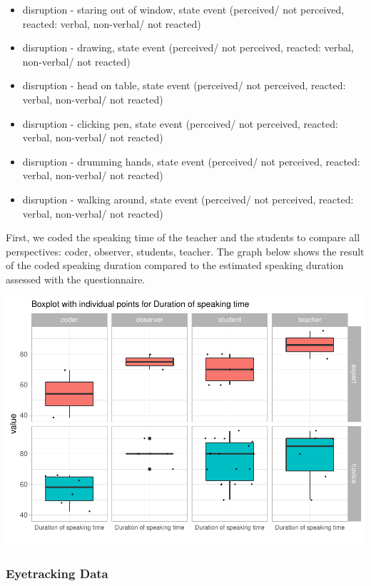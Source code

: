 \documentclass[
  english,
  man,floatsintext]{apa6}
\begin{document}
\begin{itemize}
\item
  disruption - staring out of window, state event (perceived/ not perceived, reacted: verbal, non-verbal/ not reacted)
\item
  disruption - drawing, state event (perceived/ not perceived, reacted: verbal, non-verbal/ not reacted)
\item
  disruption - head on table, state event (perceived/ not perceived, reacted: verbal, non-verbal/ not reacted)
\item
  disruption - clicking pen, state event (perceived/ not perceived, reacted: verbal, non-verbal/ not reacted)
\item
  disruption - drumming hands, state event (perceived/ not perceived, reacted: verbal, non-verbal/ not reacted)
\item
  disruption - walking around, state event (perceived/ not perceived, reacted: verbal, non-verbal/ not reacted)
\end{itemize}

First, we coded the speaking time of the teacher and the students to compare all perspectives: coder, observer, students, teacher. The graph below shows the result of the coded speaking duration compared to the estimated speaking duration assessed with the questionnaire.

\includegraphics{paper_1_supplement_files/figure-latex/speaking plot-1.pdf}

\hypertarget{eyetracking-data-1}{%
\subsubsection{Eyetracking Data}\label{eyetracking-data-1}}
\end{document}
